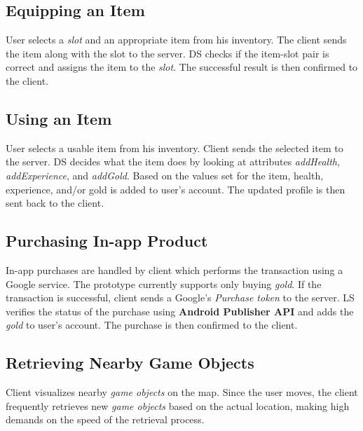 	\subsection{Equipping an Item}
	User selects a \textit{slot} and an appropriate item from his inventory. The client sends the item along with the slot to the server. DS checks if the item-slot pair is correct and assigns the item to the \textit{slot}. The successful result is then confirmed to the client.
	
	\subsection{Using an Item}
	User selects a usable item from his inventory. Client sends the selected item to the server. DS decides what the item does by looking at attributes \textit{addHealth}, \textit{addExperience}, and \textit{addGold}. Based on the values set for the item, health, experience, and/or gold is added to user's account. The updated profile is then sent back to the client.
		
	\subsection{Purchasing In-app Product}
	In-app purchases are handled by client which performs the transaction using a Google service. The prototype currently supports only buying \textit{gold}. If the transaction is successful, client sends a Google's \textit{Purchase token} to the server. LS verifies the status of the purchase using \textbf{Android Publisher API} \cite{androidpublisher} and adds the \textit{gold} to user's account. The purchase is then confirmed to the client.

	\subsection{Retrieving Nearby Game Objects}
	Client visualizes nearby \textit{game objects} on the map. Since the user moves, the client frequently retrieves new \textit{game objects} based on the actual location, making high demands on the speed of the retrieval process.
	
